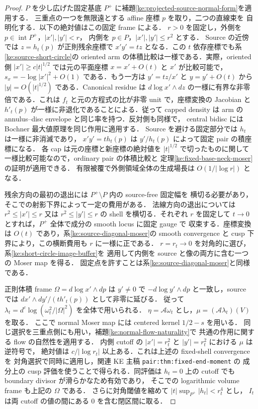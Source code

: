 \begin{proof}
$P$ を少し広げた固定基底 $P^+$ に補題\ref{ke:projected-source-normal-form}を適用する．
三重点の一つを無限遠とする affine 座標 $p$ を取り，二つの直線束を
自明化する．以下の絶対値はこの固定 frame による．
$r>0$ を固定し，外側を $p\in\operatorname{int}P^+$，$|x'|,|y'|<r$，
内側を $p\in P$，$|x'|,|y'|\le r^2$ とする．
Source の近傍では $z=h_t(p)$ が正則残余座標で
$x'y'=tz$ となる．この $t$ 依存座標でも系\ref{ke:source-short-circle}の
oriented arm の体積比較は一様である．実際，oriented 側
$|x'|\ge c|t|^{1/2}$ では元の平面座標 $x=x'+O(t)$ と $x'$ が比較可能で，
$s_x=-\log|x'|^2+O(1)$ である．もう一方は $y'=tz/x'$ と $y=y'+O(t)$
から $|y|=O(|t|^{1/2})$ である．Canonical residue は
$d\log x'\wedge dz$ の一様に有界な非零倍である．これは
$f_t$ と元の方程式の比が非零 unit で，座標変換の Jacobian と
$h'_t(p)$ が一様に非退化であることによる．従って capped density は
arm の annulus--disc envelope と同じ率を持つ．反対側も同様で，
central bidisc には Bochner 最大値原理を同じ作用に適用する．
Source を避ける固定部分では $h_t$ は一様に非消滅であり，
$x'y'=th_t(p)$ は $y'/h_t(p)$ によって固定 pair の積座標になる．
各 cap は元の座標と新座標の絶対値を $|t|^{1/2}$ で切ったものに関して
一様比較可能なので，ordinary pair の体積比較と
定理\ref{ke:fixed-base-neck-moser}の証明が適用できる．
有限被覆で外側領域全体の生成場長は $O(1/|\log r|)$ となる．

残余方向の最初の退出には $P^+\setminus P$ 内の source-free 固定幅を
横切る必要があり，そこでの射影下界によって一定の費用がある．
法線方向の退出については $r^2\le|x'|\le r$ 又は
$r^2\le|y'|\le r$ の shell を横切る．それぞれ $r$ を固定して
$t\to0$ とすれば，$P^+$ 全体で成分の smooth locus に固定 gauge で
収束する．座標変換は $O(t)$ であり，系\ref{ke:source-diagonal-moser}の
smooth convergence と cusp 下界により，この横断費用も $r$ に一様に正である．
$ r=r_t\to0$ を対角的に選び，系\ref{ke:short-circle-image-buffer}を
適用して内側を source と像の両方に含む一つの Moser map を得る．
固定点を許すことは系\ref{ke:source-diagonal-moser}と同様である．

正則体積 frame $\Omega=d\log x'\wedge dp$ は $y'\ne0$ で
$-d\log y'\wedge dp$ と一致し，source では
$dx'\wedge dy'/(t h'_t(p))$ として非零に延びる．
従って $\lambda_t=d^c\log(\omega_t^2/|\Omega|^2)$ を全体で用いられる．
$\eta=\mathcal A\omega_t$ とし，$\mu=(\mathcal A\lambda_t)(V)$ を取る．
ここで normal Moser map には centered kernel $1/2-s$ を用いる．
同じ選択を三重点側にも用い，補題\ref{ke:normal-flow-naturality}で
共通の作用に関する flow の自然性を適用する．
内側 cutoff の $|x'|=r_t^2$ と $|y'|=r_t^2$ における $\mu$ は逆符号で，
絶対値は $c/|\log r_t|$ 以上ある．これは上述の fixed-shell convergence を
対角選択で同時に適用し，関連 KE 主稿 \texttt{pair:thm:fixed-end-moment} の
成分上の cusp 評価を使うことで得られる．同評価は $h_t=0$ 上の
cutoff でも boundary divisor が滑らかなため有効であり，
そこでの logarithmic volume frame も上記の $\Omega$ である．
さらに対角閾値を縮めて $|t|\sup_{P^+}|h_t|<r_t^4$ とし，
$I_t$ は両 cutoff の値の間にある $0$ を含む閉区間に取る．


\end{proof}
